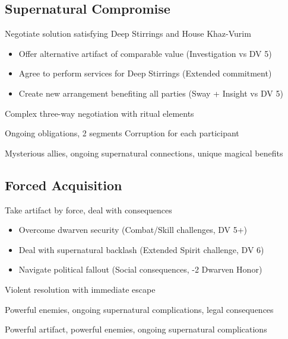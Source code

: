 \documentclass[11pt]{article}
\newenvironment{resolution}[1]{\begin{description}[leftmargin=*,style=standard]\item[\textbf{#1}]}{\end{description}}
\begin{document}
\subsection{Supernatural Compromise}
\begin{resolution}{Supernatural Compromise}
\item[Approach:] Negotiate solution satisfying Deep Stirrings and House Khaz-Vurim
\item[Options:] 
  \begin{itemize}
    \item Offer alternative artifact of comparable value (Investigation vs DV 5)
    \item Agree to perform services for Deep Stirrings (Extended commitment)
    \item Create new arrangement benefiting all parties (Sway + Insight vs DV 5)
  \end{itemize}
\item[Procedure:] Complex three-way negotiation with ritual elements
\item[Costs:] Ongoing obligations, 2 segments Corruption for each participant
\item[Outcome:] Mysterious allies, ongoing supernatural connections, unique magical benefits
\end{resolution}

\subsection{Forced Acquisition}
\begin{resolution}{Forced Acquisition}
\item[Approach:] Take artifact by force, deal with consequences
\item[Requirements:] 
  \begin{itemize}
    \item Overcome dwarven security (Combat/Skill challenges, DV 5+)
    \item Deal with supernatural backlash (Extended Spirit challenge, DV 6)
    \item Navigate political fallout (Social consequences, -2 Dwarven Honor)
  \end{itemize}
\item[Procedure:] Violent resolution with immediate escape
\item[Costs:] Powerful enemies, ongoing supernatural complications, legal consequences
\item[Outcome:] Powerful artifact, powerful enemies, ongoing supernatural complications
\end{resolution}
\end{document}
